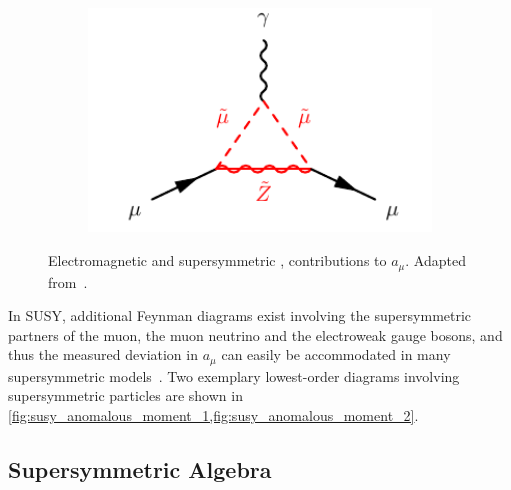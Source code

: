 \begin{figure}
\begin{subfigure}[b]{0.33\linewidth}
		\caption{\label{fig:susy_anomalous_moment_1}}
	\end{subfigure}%
	\begin{subfigure}[b]{0.33\linewidth}
		\centering\includegraphics[width=1.0\textwidth]{susy_anomalous_moment_2}
		\caption{\label{fig:susy_anomalous_moment_2}}
	\end{subfigure}	
	\caption{Electromagnetic  and supersymmetric ,  contributions to $a_\mu$. Adapted from~\cite{baer_tata_2006}.}\label{fig:loop_corrections_anomalous_moment}
\end{figure}

In SUSY, additional Feynman diagrams exist involving the supersymmetric partners of the muon, the muon neutrino and the electroweak gauge bosons, and thus the measured deviation in $a_\mu$ can easily be accommodated in many supersymmetric models~\cite{Czarnecki:2001pv,Feng:2001tr}. Two exemplary lowest-order diagrams involving supersymmetric particles are shown in \cref{fig:susy_anomalous_moment_1,fig:susy_anomalous_moment_2}.


\subsection{Supersymmetric Algebra}\label{sec:susy_algebra}

